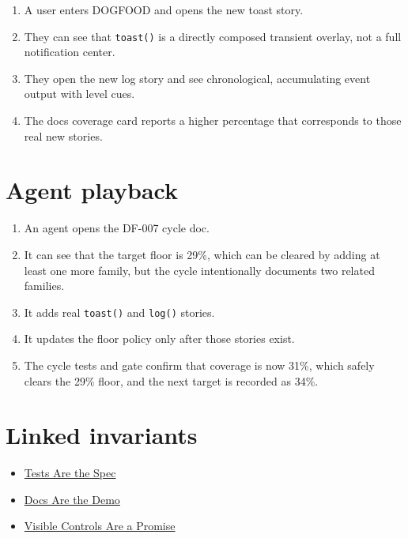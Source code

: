 \begin{enumerate}
\def\labelenumi{\arabic{enumi}.}
\tightlist
\item
  A user enters DOGFOOD and opens the new toast story.
\item
  They can see that \texttt{t\allowbreak{}o\allowbreak{}a\allowbreak{}s\allowbreak{}t\allowbreak{}(\allowbreak{})} is a directly composed transient overlay, not a full notification center.
\item
  They open the new log story and see chronological, accumulating event output with level cues.
\item
  The docs coverage card reports a higher percentage that corresponds to those real new stories.
\end{enumerate}

\section{Agent playback}\label{record-069-agent-playback}

\begin{enumerate}
\def\labelenumi{\arabic{enumi}.}
\tightlist
\item
  An agent opens the DF-007 cycle doc.
\item
  It can see that the target floor is 29\%, which can be cleared by adding at least one more family, but the cycle intentionally documents two related families.
\item
  It adds real \texttt{t\allowbreak{}o\allowbreak{}a\allowbreak{}s\allowbreak{}t\allowbreak{}(\allowbreak{})} and \texttt{l\allowbreak{}o\allowbreak{}g\allowbreak{}(\allowbreak{})} stories.
\item
  It updates the floor policy only after those stories exist.
\item
  The cycle tests and gate confirm that coverage is now 31\%, which safely clears the 29\% floor, and the next target is recorded as 34\%.
\end{enumerate}

\section{Linked invariants}\label{record-069-linked-invariants}

\begin{itemize}
\tightlist
\item
  \href{https://github.com/flyingrobots/bijou/blob/cbd70612140e7a450d764b3c7be1c6af878b99bc/docs/invariants/tests-are-the-spec.md}{Tests Are the Spec}
\item
  \href{https://github.com/flyingrobots/bijou/blob/cbd70612140e7a450d764b3c7be1c6af878b99bc/docs/invariants/docs-are-the-demo.md}{Docs Are the Demo}
\item
  \href{https://github.com/flyingrobots/bijou/blob/cbd70612140e7a450d764b3c7be1c6af878b99bc/docs/invariants/visible-controls-are-a-promise.md}{Visible Controls Are a Promise}
\end{itemize}

